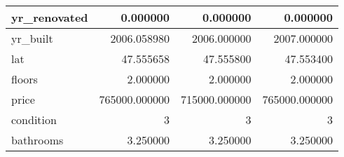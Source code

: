 \begin{table}[H]
\begin{tabular}{|l|r|r|r|}
\hline yr\_renovated & \cellcolor[rgb]{0.9, 0.54, 0.52} 0.000000 & \cellcolor[rgb]{0.9, 0.54, 0.52} 0.000000 & \cellcolor[rgb]{0.9, 0.54, 0.52} 0.000000 \\
\hline yr\_built & \cellcolor[rgb]{0.9, 0.54, 0.52} 2006.058980 & 2006.000000 & 2007.000000 \\
\hline lat & \cellcolor[rgb]{0.9, 0.54, 0.52} 47.555658 & 47.555800 & 47.553400 \\
\hline floors & \cellcolor[rgb]{0.9, 0.54, 0.52} 2.000000 & \cellcolor[rgb]{0.9, 0.54, 0.52} 2.000000 & \cellcolor[rgb]{0.9, 0.54, 0.52} 2.000000 \\
\hline price & \cellcolor[rgb]{0.9, 0.54, 0.52} 765000.000000 & 715000.000000 & \cellcolor[rgb]{0.9, 0.54, 0.52} 765000.000000 \\
\hline condition & \cellcolor[rgb]{0.9, 0.54, 0.52} 3 & \cellcolor[rgb]{0.9, 0.54, 0.52} 3 & \cellcolor[rgb]{0.9, 0.54, 0.52} 3 \\
\hline bathrooms & \cellcolor[rgb]{0.9, 0.54, 0.52} 3.250000 & \cellcolor[rgb]{0.9, 0.54, 0.52} 3.250000 & \cellcolor[rgb]{0.9, 0.54, 0.52} 3.250000 \\
\hline
\end{tabular}
\end{table}
